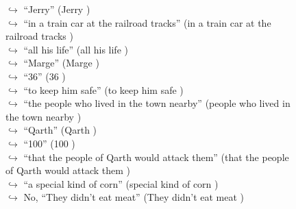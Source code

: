\documentclass[11pt,a4paper, onecolumn]{article}
\begin{document}
\begin{figure}[t] \small \begin{tcolorbox}[boxsep=0pt,left=5pt,right=0pt,top=2pt,colback = yellow!5] \begin{dialogue}
 \small 
\colorbox{pink!25}{$\hookrightarrow$}
{ ``Jerry'' (Jerry ) }
\\
\colorbox{pink!25}{$\hookrightarrow$}
{ ``in a train car at the railroad tracks'' (in a train car at the railroad tracks ) }
\\
\colorbox{pink!25}{$\hookrightarrow$}
{ ``all his life'' (all his life ) }
\\
\colorbox{pink!25}{$\hookrightarrow$}
{ ``Marge'' (Marge ) }
\\
\colorbox{pink!25}{$\hookrightarrow$}
{ ``36'' (36 ) }
\\
\colorbox{pink!25}{$\hookrightarrow$}
{ ``to keep him safe'' (to keep him safe ) }
\\
\colorbox{pink!25}{$\hookrightarrow$}
{ ``the people who lived in the town nearby'' (people who lived in the town nearby ) }
\\
\colorbox{pink!25}{$\hookrightarrow$}
{ ``Qarth'' (Qarth ) }
\\
\colorbox{pink!25}{$\hookrightarrow$}
{ ``100'' (100 ) }
\\
\colorbox{pink!25}{$\hookrightarrow$}
{ ``that the people of Qarth would attack them'' (that the people of Qarth would attack them ) }
\\
\colorbox{pink!25}{$\hookrightarrow$}
{ ``a special kind of corn'' (special kind of corn ) }
\\
\colorbox{pink!25}{$\hookrightarrow$}
\colorbox{red!25}{No,}
{ ``They didn't eat meat'' (They didn't eat meat ) }
\\

\end{dialogue}
\end{tcolorbox}
\end{figure}
\end{document}
